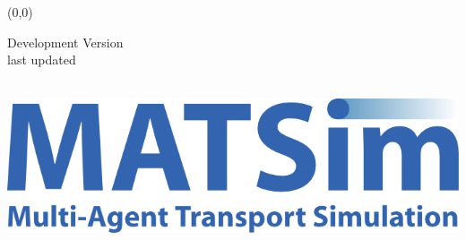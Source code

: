 \begin{titlepage}
\makeatletter
\pagestyle{empty}


\makebox(0,0){} %
\vspace{3cm}
\par
\raggedright
{\textcolor{Medium}{\fontsize{45}{60}\sffamily\bfseries \@title}}\par
\vspace{1cm}
{\textcolor{Medium}{\titleFontSmall Development Version\\last updated \@date}}\par
\vspace{15cm}
{\titleFontSmall \mdseries\par\@author}\\
\vspace{2cm}
\raggedleft
\includegraphics[width=.33\textwidth]{figures/MATSimLogo_blue.png}

\makeatother
\end{titlepage}